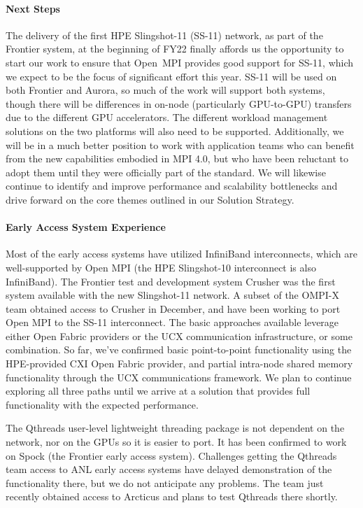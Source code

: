 \paragraph{Next Steps}
The delivery of the first HPE Slingshot-11 (SS-11) network, as part of the Frontier system, at the beginning of FY22 finally affords us
the opportunity to start our work to ensure that Open~MPI provides good support for SS-11, which we expect to be the focus of significant
effort this year.  SS-11 will be used on both Frontier and Aurora, so much of the work will support both systems, though there will be differences 
in on-node (particularly GPU-to-GPU) transfers due to the different GPU accelerators.  The different workload management solutions on the two platforms
will also need to be supported.  Additionally, we will be in a much better position to work with application teams who can benefit from the new capabilities 
embodied in MPI 4.0, but who have been reluctant to adopt them until they were officially part of the standard.  
We will likewise continue to identify and improve performance and scalability bottlenecks and drive forward on
the core themes outlined in our Solution Strategy.

\paragraph{Early Access System Experience}
Most of the early access systems have utilized InfiniBand interconnects, which are well-supported 
by Open MPI (the HPE Slingshot-10 interconnect is also InfiniBand).  The Frontier test and development
system Crusher was the first system available with the new Slingshot-11 network.  A subset of the
OMPI-X team obtained access to Crusher in December, and have been working to port Open MPI to
the SS-11 interconnect.  The basic approaches available leverage either Open Fabric providers or
the UCX communication infrastructure, or some combination.
So far, we've confirmed basic point-to-point functionality using the HPE-provided
CXI Open Fabric provider, and partial intra-node shared memory functionality through the 
UCX communications framework.
We plan to continue exploring all three paths until we arrive at a solution that provides full functionality
with the expected performance.

The Qthreads user-level lightweight threading package is not dependent on the network, nor on the GPUs
so it is easier to port.  It has been confirmed to work on Spock (the Frontier early access system).
Challenges getting the Qthreads team access to ANL early access systems have delayed demonstration
of the functionality there, but we do not anticipate any problems.  The team just recently obtained
access to Arcticus and plans to test Qthreads there shortly.
